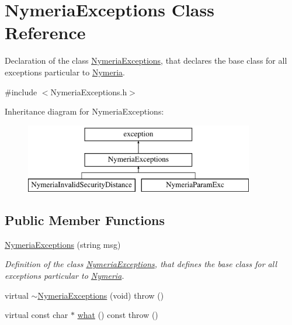 \hypertarget{class_nymeria_exceptions}{}\section{Nymeria\+Exceptions Class Reference}
\label{class_nymeria_exceptions}


Declaration of the class \hyperlink{class_nymeria_exceptions}{Nymeria\+Exceptions}, that declares the base class for all exceptions particular to \hyperlink{class_nymeria}{Nymeria}.  




{\ttfamily \#include $<$Nymeria\+Exceptions.\+h$>$}

Inheritance diagram for Nymeria\+Exceptions\+:\begin{figure}[H]
\begin{center}
\leavevmode
\includegraphics[height=3.000000cm]{class_nymeria_exceptions}
\end{center}
\end{figure}
\subsection*{Public Member Functions}
\begin{DoxyCompactItemize}
\item 
\hyperlink{class_nymeria_exceptions_a2ffc37214bfd0d77123c81e4d11f05c3}{Nymeria\+Exceptions} (string msg)
\begin{DoxyCompactList}\small\item\em Definition of the class \hyperlink{class_nymeria_exceptions}{Nymeria\+Exceptions}, that defines the base class for all exceptions particular to \hyperlink{class_nymeria}{Nymeria}. \end{DoxyCompactList}\item 
virtual \hyperlink{class_nymeria_exceptions_a3c8a85626f56eeb615907c4125d8d9c3}{$\sim$\+Nymeria\+Exceptions} (void)  throw ()
\item 
virtual const char $\ast$ \hyperlink{class_nymeria_exceptions_ab2330e7001e60ca05b3ed72b616b9c8f}{what} () const   throw ()
\end{DoxyCompactItemize}


